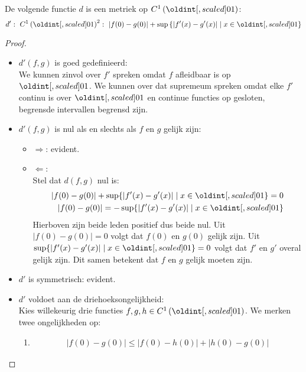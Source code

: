 \documentclass[main.tex]{subfiles}
\begin{document}
\begin{vb}
  De volgende functie $d$ is een metriek op $C^{1}\left(\interval{0}{1}\right)$:
  \[ d':\ C^{1}\left(\interval{0}{1}\right)^{2}:\ |f(0)-g(0)| + \sup\left\{ |f'(x)-g'(x)| \mid x\in\interval{0}{1} \right\} \]

  \begin{proof}
    \noindent
    \begin{itemize}
    \item $d'(f,g)$ is goed gedefinieerd:\\
      We kunnen zinvol over $f'$ spreken omdat $f$ afleidbaar is op $\interval{0}{1}$.
      We kunnen over dat supremeum spreken omdat elke $f'$ continu is over $\interval{0}{1}$ en continue functies op gesloten, begrensde intervallen begrensd zijn.
    \item $d'(f,g)$ is nul als en slechts als $f$ en $g$ gelijk zijn:
      \begin{itemize}
      \item $\Rightarrow$: evident.
      \item $\Leftarrow$:\\
        Stel dat $d(f,g)$ nul is:
        \begin{align*}
          |f(0)-g(0)| + \sup\{ |f'(x)-g'(x)| \mid x\in\interval{0}{1} \} = 0\\
          |f(0)-g(0)| = -\sup\{ |f'(x)-g'(x)| \mid x\in\interval{0}{1} \}\\
        \end{align*}
        Hierboven zijn beide leden positief dus beide nul.
        Uit $|f(0)-g(0)| = 0$ volgt dat $f(0)$ en $g(0)$ gelijk zijn.
        Uit $\sup\{ |f'(x)-g'(x)| \mid x\in\interval{0}{1} \}=0$ volgt dat $f'$ en $g'$ overal gelijk zijn.
        Dit samen betekent dat $f$ en $g$ gelijk moeten zijn.
      \end{itemize}
    \item $d'$ is symmetrisch: evident.
    \item $d'$ voldoet aan de driehoeksongelijkheid:\\
      Kies willekeurig drie functies $f,g,h\in C^{1}\left(\interval{0}{1}\right)$.
      We merken twee ongelijkheden op:
      \begin{enumerate}
      \item 
        \begin{align*}
          |f(0)-g(0)| \le |f(0)-h(0)| + |h(0)-g(0)|
        \end{align*}

\end{enumerate}
\end{itemize}
\end{proof}
\end{vb}
\end{document}
